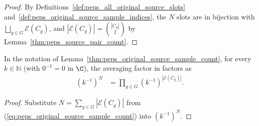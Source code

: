 \begin{proof}
    \leanok
    By Definitions~\ref{def:peps_all_original_source_slots}
    and~\ref{def:peps_original_source_sample_indices}, the $N$ slots are in
    bijection with $\bigsqcup_{g\in G}\mathcal E(C_g)$, and
    $|\mathcal E(C_g)|=\binom{|C_g|}{2}$ by Lemma~\ref{thm:peps_source_pair_count}.
\end{proof}

\begin{lemma}
    \label{thm:peps_original_source_sample_averaging}
    \leanok
    In the notation of Lemma~\ref{thm:peps_original_source_sample_count}, for
    every $k\in\mathbb N$ (with $0^{-1}=0$ in $\C$), the averaging factor in
    \cite[proof of Theorem~5.2]{OpenAI2026PolynomialPEPS} factors as
    \begin{align}
        (k^{-1})^N & =\prod_{g\in G}(k^{-1})^{|\mathcal E(C_g)|}.
        \label{eq:peps_original_source_sample_averaging}
    \end{align}
\end{lemma}

\begin{proof}
    \leanok
    Substitute $N=\sum_{g\in G}|\mathcal E(C_g)|$ from
    (\ref{eq:peps_original_source_sample_count}) into $(k^{-1})^N$.
\end{proof}
